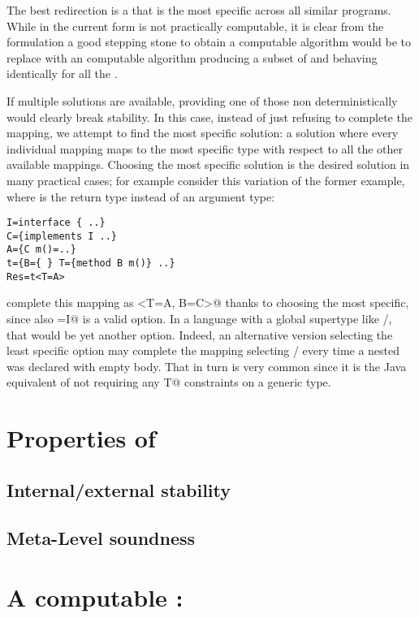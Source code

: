 The best redirection is a 
that is the most specific across all similar programs.
While  in the current form is not
practically computable, it is clear from the formulation
a good stepping stone to obtain a computable algorithm 
would be to
replace 
with an computable algorithm producing a subset of  and behaving identically for
all the .

If multiple solutions are available, providing one of those non deterministically would clearly break stability.
In this case, instead of just refusing to complete the mapping, we attempt to find the most specific solution: a solution where every individual mapping maps to the most specific type with respect to all the other available mappings.
Choosing the most specific solution is the desired solution in many practical cases; for example consider this variation of the former example, where
\Q@B@ is the return type instead of an argument type:

\begin{lstlisting}
I=interface { ..}
C={implements I ..}
A={C m()=..}
t={B={ } T={method B m()} ..}
Res=t<T=A>
\end{lstlisting}
 complete this mapping as \Q@<T=A, B=C>@ thanks to
choosing the most specific, since also \Q@B=I@ is a valid option.
In a language with a global supertype like \Q@Any@/\Q@Object@, that would
be yet another option.
Indeed, an alternative version selecting the  least specific
option may complete the mapping selecting \Q@Any@/\Q@Object@
every time a nested was declared with empty body. That in turn is very common since it is the Java equivalent of not requiring any
\Q@extends T@ constraints on a generic type.


\section{Properties of }
\subsection{Internal/external stability}
\subsection{Meta-Level soundness}

\section{A computable : }


